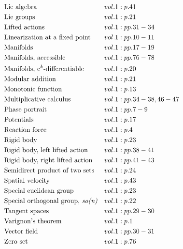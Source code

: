 \documentclass[a4paper]{article}
\begin{document}
\begin{align*}
&\text{Lie algebra} \hfill&& vol. 1: p. 41\\
&\text{Lie groups} \hfill&& vol. 1: p. 21\\
&\text{Lifted actions} \hfill&& vol. 1: pp. 31-34\\
&\text{Linearization at a fixed point} \hfill&& vol. 1: pp. 10-11\\
&\text{Manifolds} \hfill&& vol. 1: pp. 17-19\\
&\text{Manifolds, accessible} \hfill&& vol. 1: pp. 76-78\\
&\text{Manifolds, c$^k$-differentiable} \hfill&& vol. 1: p. 20\\
&\text{Modular addition} \hfill&& vol. 1: p. 21\\
&\text{Monotonic function} \hfill&& vol. 1: p. 13\\
&\text{Multiplicative calculus} \hfill&& vol. 1: pp. 34-38, 46-47\\
&\text{Phase portrait} \hfill&& vol. 1: pp. 7-9\\
&\text{Potentials} \hfill&& vol. 1: p. 17\\
&\text{Reaction force} \hfill&& vol. 1: p. 4\\
&\text{Rigid body} \hfill&& vol. 1: p. 23\\
&\text{Rigid body, left lifted action} \hfill&& vol. 1: pp. 38-41\\
&\text{Rigid body, right lifted action} \hfill&& vol. 1: pp. 41-43\\
&\text{Semidirect product of two sets} \hfill&& vol. 1: p. 24\\
&\text{Spatial velocity} \hfill&& vol. 1: p. 43\\
&\text{Special euclidean group} \hfill&& vol. 1: p. 23\\
&\text{Special orthogonal group, \emph{so(n)}} \hfill&& vol. 1: p. 22\\
&\text{Tangent spaces} \hfill&& vol. 1: pp. 29-30\\
&\text{Varignon's theorem} \hfill&& vol. 1: p. 1\\
&\text{Vector field} \hfill&& vol. 1: pp. 30-31\\
&\text{Zero set} \hfill&& vol. 1: p. 76\\
\end{align*} 
\end{document}

